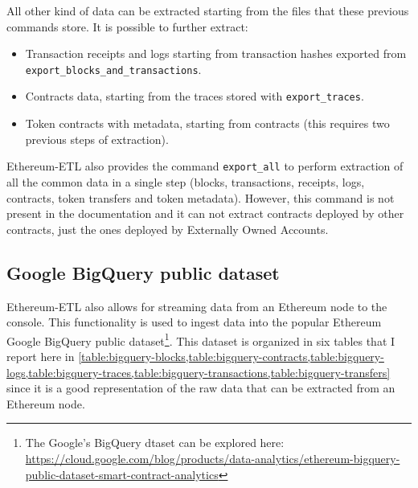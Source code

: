 \noindent All other kind of data can be extracted starting from the files that these previous commands store. It is possible to further extract:

\begin{itemize}
    \item Transaction receipts and logs starting from transaction hashes exported from \verb|export_blocks_and_transactions|.
    \item Contracts data, starting from the traces stored with \verb|export_traces|.
    \item Token contracts with metadata, starting from contracts (this requires two previous steps of extraction). 
\end{itemize}

Ethereum-ETL also provides the command {\tt export\_all} to perform extraction of all the common data in a single step (blocks, transactions, receipts, logs, contracts, token transfers and token metadata). However, this command is not present in the documentation and it can not extract contracts deployed by other contracts, just the ones deployed by Externally Owned Accounts. 

\subsection{Google BigQuery public dataset}

\noindent Ethereum-ETL also allows for streaming data from an Ethereum node to the console. This functionality is used to ingest data into the popular Ethereum Google BigQuery public dataset\footnote{The Google's BigQuery dtaset can be explored here: \url{https://cloud.google.com/blog/products/data-analytics/ethereum-bigquery-public-dataset-smart-contract-analytics}}. This dataset is organized in six tables that I report here in \cref{table:bigquery-blocks,table:bigquery-contracts,table:bigquery-logs,table:bigquery-traces,table:bigquery-transactions,table:bigquery-transfers} since it is a good representation of the raw data that can be extracted from an Ethereum node.

